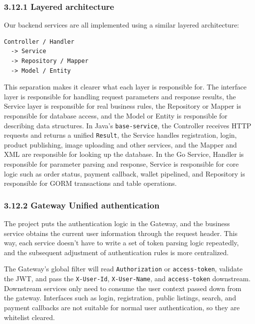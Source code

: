 \documentclass{article}
\begin{document}
\subsubsection{3.12.1 Layered architecture}

Our backend services are all implemented using a similar layered architecture:

\begin{verbatim}
Controller / Handler
  -> Service
  -> Repository / Mapper
  -> Model / Entity
\end{verbatim}

This separation makes it clearer what each layer is responsible for. The interface layer is responsible for handling request parameters and response results, the Service layer is responsible for real business rules, the Repository or Mapper is responsible for database access, and the Model or Entity is responsible for describing data structures. In Java's \texttt{base-service}, the Controller receives HTTP requests and returns a unified \texttt{Result}, the Service handles registration, login, product publishing, image uploading and other services, and the Mapper and XML are responsible for looking up the database. In the Go Service, Handler is responsible for parameter parsing and response, Service is responsible for core logic such as order status, payment callback, wallet pipelined, and Repository is responsible for GORM transactions and table operations.

\subsubsection{3.12.2 Gateway Unified authentication}

The project puts the authentication logic in the Gateway, and the business service obtains the current user information through the request header. This way, each service doesn't have to write a set of token parsing logic repeatedly, and the subsequent adjustment of authentication rules is more centralized.

The Gateway's global filter will read \texttt{Authorization} or \texttt{access-token}, validate the JWT, and pass the \texttt{X-User-Id}, \texttt{X-User-Name}, and \texttt{access-token} downstream. Downstream services only need to consume the user context passed down from the gateway. Interfaces such as login, registration, public listings, search, and payment callbacks are not suitable for normal user authentication, so they are whitelist cleared.
\end{document}
